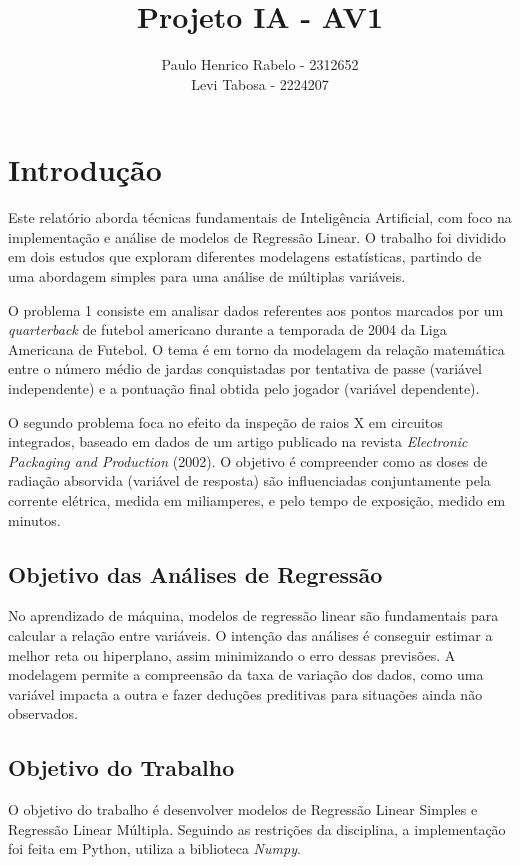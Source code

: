 \documentclass{article}
\title{Projeto IA - AV1}
\date{}
\author{Paulo Henrico Rabelo - 2312652 \\ Levi Tabosa - 2224207}
\begin{document}
\maketitle
\tableofcontents

\section{Introdução}
Este relatório aborda técnicas fundamentais de Inteligência Artificial, com foco na implementação e análise de modelos de Regressão Linear. O trabalho foi dividido em dois estudos que exploram diferentes modelagens estatísticas, partindo de uma abordagem simples para uma análise de múltiplas variáveis.

O problema 1 consiste em analisar dados referentes aos pontos marcados por um \textit{quarterback} de futebol americano durante a temporada de 2004 da Liga Americana de Futebol. O tema é em torno da modelagem da relação matemática entre o número médio de jardas conquistadas por tentativa de passe (variável independente) e a pontuação final obtida pelo jogador (variável dependente).

O segundo problema foca no efeito da inspeção de raios X em circuitos integrados, baseado em dados de um artigo publicado na revista \textit{Electronic Packaging and Production} (2002). O objetivo é compreender como as doses de radiação absorvida (variável de resposta) são influenciadas conjuntamente pela corrente elétrica, medida em miliamperes, e pelo tempo de exposição, medido em minutos.

\subsection{Objetivo das Análises de Regressão}
No aprendizado de máquina, modelos de regressão linear são fundamentais para calcular a relação entre variáveis. O intenção das análises é conseguir estimar a melhor reta ou hiperplano, assim minimizando o erro dessas previsões. A modelagem permite a compreensão da taxa de variação dos dados, como uma variável impacta a outra e fazer deduções preditivas para situações ainda não observados.

\subsection{Objetivo do Trabalho}
O objetivo do trabalho é desenvolver modelos de Regressão Linear Simples e Regressão Linear Múltipla. Seguindo as restrições da disciplina, a implementação foi feita em Python, utiliza a biblioteca \textit{Numpy}.
\end{document}
